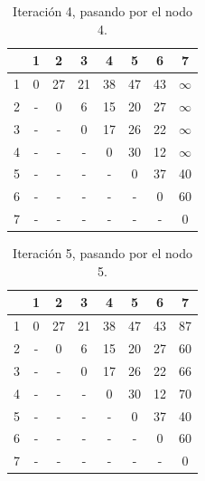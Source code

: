 \documentclass[letterpaper,10pt]{article}
\begin{document}
\begin{enumerate}
        \begin{minipage}[t]{0.47\textwidth}
            \begin{table}[H]
                \centering
            \begin{tabular}{|c|c|c|c|c|c|c|c|}\hline
                   & 1 & 2 & 3 & 4 & 5 & 6 & 7   \\ \hline
                 1 & $0$ & 27 & 21 & 38 & 47 & 43 & $\infty$      \\\hline
                 2 & -  & 0  & 6  & 15  & 20  & 27  & $\infty$   \\\hline
                 3 & -  & -  & 0  & 17  & 26  & 22  & $\infty$   \\\hline
                 4 & -  & -  & -  & 0  & 30  & 12  & $\infty$   \\\hline
                 5 & -  & -  & -  & -  & 0  & 37  & 40  \\\hline
                 6 & -  & -  & -  & -  & -  & 0  & 60   \\\hline
                 7 & -  & -  & -  & -  & -  & -  & 0   \\\hline
                \end{tabular}
                \caption{Iteración 4, pasando por el nodo 4.}
                \label{tablitafloyd4}
            \end{table}
        \end{minipage}
        \begin{minipage}[t]{0.47\textwidth}
            \begin{table}[H]
                \centering
            \begin{tabular}{|c|c|c|c|c|c|c|c|}\hline
                   & 1 & 2 & 3 & 4 & 5 & 6 & 7   \\ \hline
                 1 & 0  & 27 & 21 & 38 & 47 & 43 & 87     \\\hline
                 2 & -  & 0  & 6  & 15  & 20  & 27  & 60  \\\hline
                 3 & -  & -  & 0  & 17  & 26  & 22  & 66  \\\hline
                 4 & -  & -  & -  & 0  & 30  & 12  & 70   \\\hline
                 5 & -  & -  & -  & -  & 0  & 37  & 40  \\\hline
                 6 & -  & -  & -  & -  & -  & 0  & 60   \\\hline
                 7 & -  & -  & -  & -  & -  & -  & 0   \\\hline
                \end{tabular}
                \caption{Iteración 5, pasando por el nodo 5.}
                \label{tablitafloyd5}
            \end{table}
        \end{minipage}


\end{enumerate}
\end{document}
